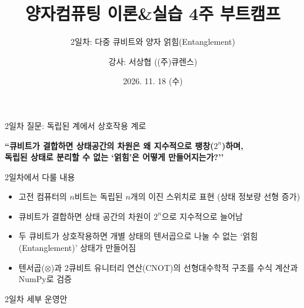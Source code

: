 \documentclass[aspectratio=169, 10pt]{beamer}
\title[양자컴퓨팅 부트캠프 2일차]{양자컴퓨팅 이론\&실습 4주 부트캠프}
\subtitle{2일차: 다중 큐비트와 양자 얽힘(Entanglement)}
\author{강사: 서상협 ((주)큐렌스)}
\date{2026. 11. 18 (수)}
\begin{document}
\frame{\titlepage}

\begin{frame}{2일차 질문: 독립된 계에서 상호작용 계로}
    \begin{center}
        \large \textbf{``큐비트가 결합하면 상태공간의 차원은 왜 지수적으로 팽창($2^n$)하며,\\독립된 상태로 분리할 수 없는 `얽힘'은 어떻게 만들어지는가?''}
    \end{center}
    \pause
    \vspace{0.2cm}
    \begin{qcblock}{2일차에서 다룰 내용}
        \begin{itemize}
            \item 고전 컴퓨터의 $n$비트는 독립된 $n$개의 이진 스위치로 표현 (상태 정보량 선형 증가)
            \pause
            \item 큐비트가 결합하면 상태 공간의 차원이 $2^n$으로 지수적으로 늘어남
            \pause
            \item 두 큐비트가 상호작용하면 개별 상태의 텐서곱으로 나눌 수 없는 `얽힘(Entanglement)' 상태가 만들어짐
            \pause
            \item 텐서곱($\otimes$)과 2큐비트 유니터리 연산(CNOT)의 선형대수학적 구조를 수식 계산과 NumPy로 검증
        \end{itemize}
    \end{qcblock}
\end{frame}

\begin{frame}{2일차 세부 운영안}
    \begin{center}
    \end{center}
\end{frame}
\end{document}
